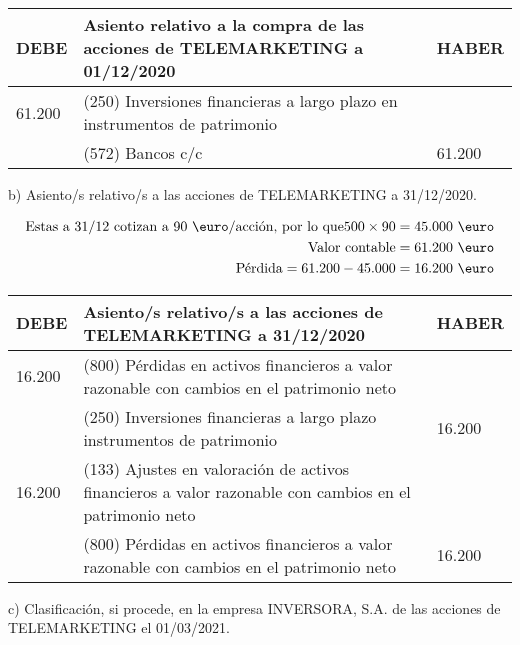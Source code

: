 \begin{table}[H]
    \centering
    \begin{tabular}{|p{3cm}|p{6cm}|p{3cm}|}
    \hline
    \rowcolor{blue!30}
    \textbf{DEBE} & \textbf{Asiento relativo a la compra de las acciones de TELEMARKETING a 01/12/2020} & \textbf{HABER} \\
    \hline
    61.200 & (250) Inversiones financieras a largo plazo en instrumentos de patrimonio & \\
    \hline
    & (572) Bancos c/c & 61.200 \\
    \hline
    \end{tabular}
\end{table}





b) Asiento/s relativo/s a las acciones de TELEMARKETING a 31/12/2020.

\begin{align*}
    \text{Estas a 31/12 cotizan a 90 \euro/acción, por lo que} 500 \times 90 = \text{45.000} \text{ \euro} \\
    \text{Valor contable} = 61.200 \text{ \euro} \\
    \text{Pérdida} = 61.200 - 45.000 = 16.200 \text{ \euro}
\end{align*}

\begin{table}[H]
    \centering
    \begin{tabular}{|p{3cm}|p{6cm}|p{3cm}|}
    \hline
    \rowcolor{blue!30}
    \textbf{DEBE} & \textbf{Asiento/s relativo/s a las acciones de TELEMARKETING a 31/12/2020} & \textbf{HABER} \\
    \hline
    16.200 & (800) Pérdidas en activos financieros a valor razonable con cambios en el patrimonio neto & \\
    \hline
    & (250) Inversiones financieras a largo plazo instrumentos de patrimonio & 16.200 \\
    \hline
    16.200 & (133) Ajustes en valoración de activos financieros a valor razonable con cambios en el patrimonio neto & \\
    \hline
    & (800) Pérdidas en activos financieros a valor razonable con cambios en el patrimonio neto & 16.200 \\
    \hline
    \end{tabular}
\end{table}


c) Clasificación, si procede, en la empresa INVERSORA, S.A. de las acciones de TELEMARKETING el 01/03/2021.

